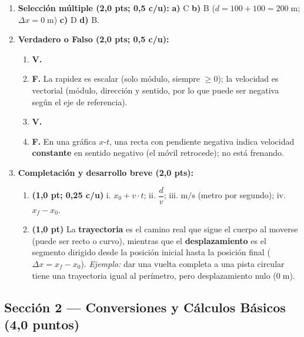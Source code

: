 \documentclass[12pt, letterpaper]{article}
\begin{document}
\begin{enumerate}[leftmargin=*, label=\textbf{\arabic*.}, itemsep=0.35em]
  \item \textbf{Selección múltiple (2,0 pts; 0,5 c/u):}
        \textbf{a)} C \quad
        \textbf{b)} B ($d = 100 + 100 = 200\;\text{m}$; $\Delta x = 0\;\text{m}$) \quad
        \textbf{c)} D \quad
        \textbf{d)} B.

  \item \textbf{Verdadero o Falso (2,0 pts; 0,5 c/u):}
        \begin{enumerate}[label=\alph*), leftmargin=1.6em, nosep]
          \item \textbf{V.}
          \item \textbf{F.} La rapidez es escalar (solo módulo, siempre $\ge 0$); la velocidad es vectorial (módulo, dirección y sentido, por lo que puede ser negativa según el eje de referencia).
          \item \textbf{V.}
          \item \textbf{F.} En una gráfica $x$-$t$, una recta con pendiente negativa indica velocidad \textbf{constante} en sentido negativo (el móvil retrocede); no está frenando.
        \end{enumerate}

  \item \textbf{Completación y desarrollo breve (2,0 pts):}
        \begin{enumerate}[label=\alph*), leftmargin=1.6em, nosep]
          \item \textbf{(1,0 pt; 0,25 c/u)}
                i. $x_0 + v \cdot t$; \quad
                ii. $\dfrac{d}{v}$; \quad
                iii. $\text{m/s}$ (metro por segundo); \quad
                iv. $x_f - x_0$.
          \item \textbf{(1,0 pt)} La \textbf{trayectoria} es el camino real que sigue el cuerpo al moverse (puede ser recto o curvo), mientras que el \textbf{desplazamiento} es el segmento dirigido desde la posición inicial hasta la posición final ($\Delta x = x_f - x_0$). \textit{Ejemplo:} dar una vuelta completa a una pista circular tiene una trayectoria igual al perímetro, pero desplazamiento nulo ($0\;\text{m}$).
        \end{enumerate}
\end{enumerate}

\subsection*{Sección 2 — Conversiones y Cálculos Básicos (4,0 puntos)}
\end{document}
